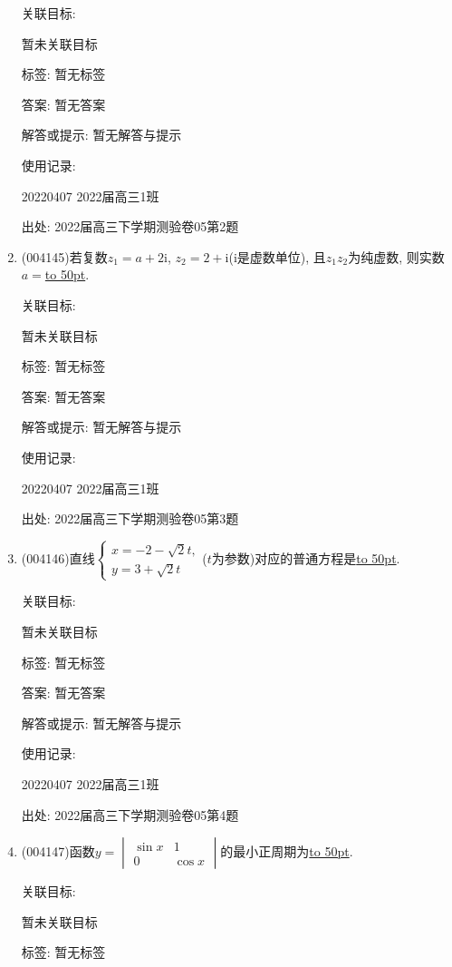 \documentclass[10pt,a4paper]{article}
\newcommand{\blank}[1]{\underline{\hbox to #1pt{}}}
\begin{document}
\begin{enumerate}[1.]
关联目标:

暂未关联目标



标签: 暂无标签

答案: 暂无答案

解答或提示: 暂无解答与提示

使用记录:

20220407	2022届高三1班	


出处: 2022届高三下学期测验卷05第2题
\item { (004145)}若复数$z_1=a+2\mathrm{i}$, $z_2=2+\mathrm{i}$($\mathrm{i}$是虚数单位), 且$z_1z_2$为纯虚数, 则实数$a=$\blank{50}.


关联目标:

暂未关联目标



标签: 暂无标签

答案: 暂无答案

解答或提示: 暂无解答与提示

使用记录:

20220407	2022届高三1班	


出处: 2022届高三下学期测验卷05第3题
\item { (004146)}直线$\begin{cases} x=-2-\sqrt 2t, \\ y=3+\sqrt 2t \end{cases}$($t$为参数)对应的普通方程是\blank{50}.


关联目标:

暂未关联目标



标签: 暂无标签

答案: 暂无答案

解答或提示: 暂无解答与提示

使用记录:

20220407	2022届高三1班	


出处: 2022届高三下学期测验卷05第4题
\item { (004147)}函数$y=\begin{vmatrix}
   \sin x & 1  \\0 & \cos x  \end{vmatrix}$的最小正周期为\blank{50}.


关联目标:

暂未关联目标



标签: 暂无标签


\end{enumerate}
\end{document}
